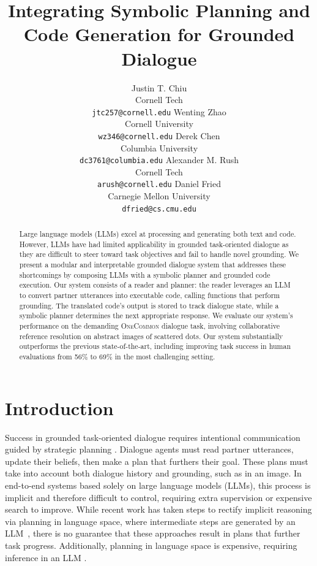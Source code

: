 \documentclass[11pt]{article}
\title{
Integrating Symbolic Planning and \\ Code Generation
for Grounded Dialogue
}
\author{
Justin T. Chiu  \\
Cornell Tech \\
\texttt{jtc257@cornell.edu}
\And
Wenting Zhao \\
Cornell University \\
\texttt{wz346@cornell.edu}
\And
Derek Chen \\
Columbia University \\
\texttt{dc3761@columbia.edu}
\And
Alexander M. Rush \\
Cornell Tech \\
\texttt{arush@cornell.edu}
\And
Daniel Fried \\
Carnegie Mellon University \\
\texttt{dfried@cs.cmu.edu}
}
\begin{document}
\maketitle
\begin{abstract}
Large language models (LLMs) excel at processing and generating both text and code. However, LLMs have had limited applicability in grounded task-oriented dialogue as they are difficult to steer toward task objectives and fail to handle novel grounding. We present a modular and interpretable grounded dialogue system that addresses these shortcomings by composing LLMs with a symbolic planner and grounded code execution. Our system consists of a reader and planner: the reader leverages an LLM to convert partner utterances into executable code, calling functions that perform grounding. The translated code's output is stored to track dialogue state, while a symbolic planner determines the next appropriate response. We evaluate our system's performance on the demanding \textsc{OneCommon} dialogue task, involving collaborative reference resolution on abstract images of scattered dots. Our system substantially outperforms the previous state-of-the-art, including improving task success in human evaluations from 56\% to 69\% in the most challenging setting.
\end{abstract}

\section{Introduction}
Success in grounded task-oriented dialogue requires intentional communication guided by strategic planning \citep[\emph{inter alia}]{cohen1979-speech-acts,traum1994computational,Walker2004-generation,Rieser2009-planning,cicero}. 
Dialogue agents must read partner utterances, update their beliefs, then make a plan that furthers their goal.
These plans must take into account both dialogue history and grounding, such as in an image.
In end-to-end systems based solely on large language models (LLMs),
this process is implicit and therefore difficult to control,
requiring extra supervision \citep{rlhf} or expensive search \citep{astaresque} to improve.
While recent work has taken steps to rectify implicit reasoning via
planning in language space, 
where intermediate steps are generated by an LLM~\citep{cot},
there is no guarantee that these approaches result in plans that further task progress.
Additionally, planning in language space is expensive,
requiring inference in an LLM \citep{yarats2017rollout,bamcp}.
\end{document}
